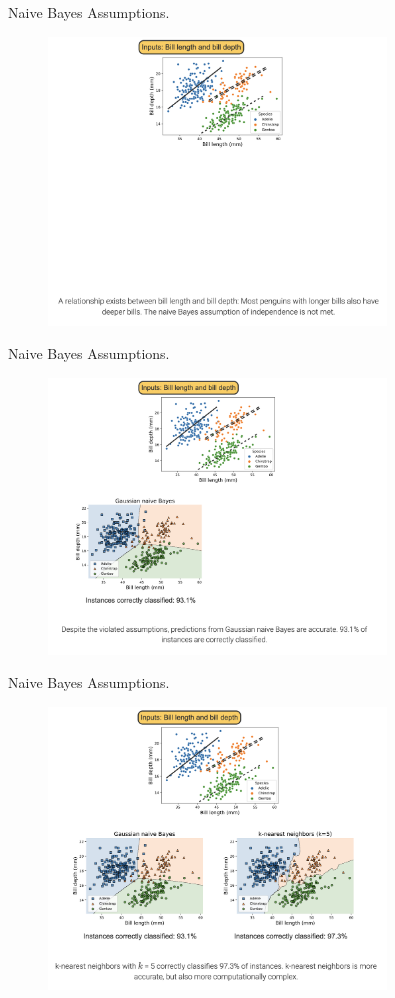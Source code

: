 \documentclass[10pt,dvipsnames]{beamer}
\begin{document}
\begin{frame}{Naive Bayes Assumptions.}
		\begin{figure}[ht]
		\centering
		\includegraphics[width=0.8\textwidth]{imgs/nb_28.png}
	\end{figure}
\end{frame}

\begin{frame}{Naive Bayes Assumptions.}
	\begin{figure}[ht]
		\centering
		\includegraphics[width=0.8\textwidth]{imgs/nb_29.png}
	\end{figure}
\end{frame}

\begin{frame}{Naive Bayes Assumptions.}
	\begin{figure}[ht]
		\centering
		\includegraphics[width=0.8\textwidth]{imgs/nb_30.png}
	\end{figure}
\end{frame}
\end{document}
